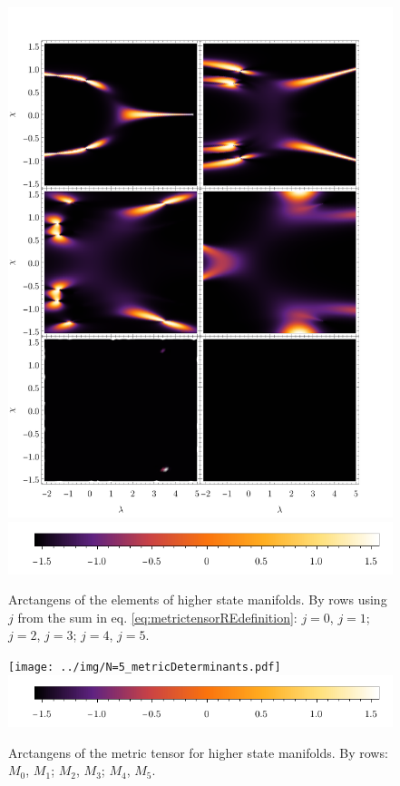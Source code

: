 \begin{figure}[H]
    \centering
    \includegraphics[scale=1.2]{../img/N=5_metricDeterminantElements.pdf}
    \includegraphics[scale=1.2]{../img/N=3_barA.pdf}
    \caption{Arctangens of the elements of higher state manifolds. By rows using $j$ from the sum in eq. \ref{eq:metrictensorREdefinition}: $j=0$, $j=1$; $j=2$, $j=3$; $j=4$, $j=5$.}
    \label{fig:metricDeterminantElements}    
\end{figure}

\begin{figure}[H]
    \centering
    \texttt{[image: ../img/N=5\_metricDeterminants.pdf]}
    \includegraphics[scale=1.2]{../img/N=3_barA.pdf}
    \caption{Arctangens of the metric tensor for higher state manifolds. By  rows: $M_0$, $M_1$; $M_2$, $M_3$; $M_4$, $M_5$.}
    \label{fig:higherStateManifolds}    
\end{figure}
















